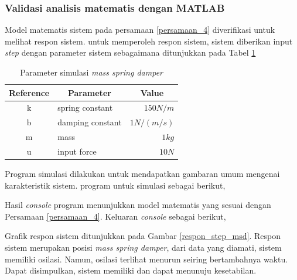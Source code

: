 \documentclass[../main.tex]{subfiles}
\begin{document}
            \subsubsection{Validasi analisis matematis dengan MATLAB}
            Model matematis sistem pada persamaan \eqref{persamaan_4} diverifikasi untuk melihat respon sistem. untuk memperoleh respon sistem, sistem diberikan input \textit{step} dengan parameter sistem sebagaimana ditunjukkan pada Tabel \ref{parameter_msd}
                \begin{table}[H]
                    \centering
                    \caption{Parameter simulasi \textit{mass spring damper}}
                    \label{parameter_msd}
                    \begin{tabular}{|c|l|r|}
                        \hline
                        Reference & \multicolumn{1}{c|}{Parameter} & \multicolumn{1}{c|}{Value} \\ \hline
                        k         & spring constant                & $150N/m$                   \\ \hline
                        b         & damping constant               & $1 N/(m/s)$                \\ \hline
                        m         & mass                           & $1kg$                      \\ \hline
                        u         & input force                    & $10N$                      \\ \hline
                    \end{tabular}
                \end{table}
                Program simulasi dilakukan untuk mendapatkan gambaran umum mengenai karakteristik sistem. program untuk simulasi sebagai berikut,
                
                Hasil \textit{console} program menunjukkan model matematis yang sesuai dengan Persamaan \eqref{persamaan_4}. Keluaran \textit{console} sebagai berikut,
                
                Grafik respon sistem ditunjukkan pada Gambar \ref{respon_step_msd}. Respon sistem merupakan posisi \textit{mass spring damper}, dari data yang diamati, sistem memiliki osilasi. Namun, osilasi terlihat menurun seiring bertambahnya waktu. Dapat disimpulkan, sistem memiliki dan dapat menunuju kesetabilan.
\end{document}
